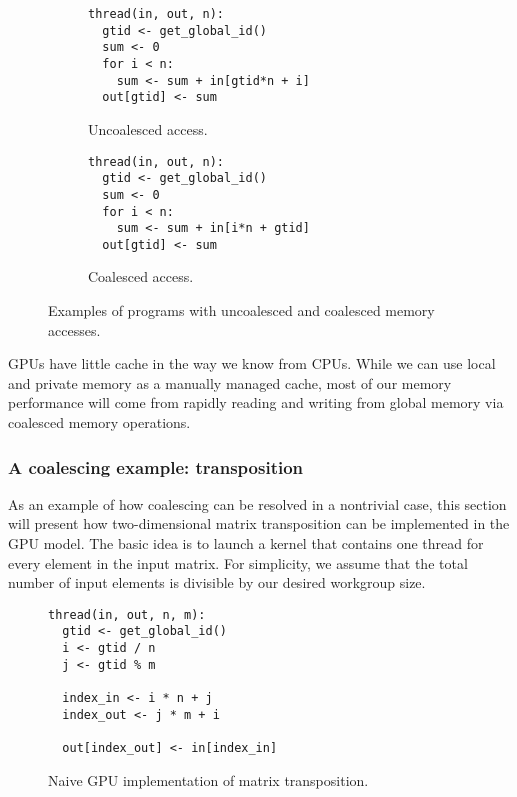 \begin{figure}
  \centering
\begin{subfigure}{0.8\textwidth}
\begin{lstlisting}[language={}]
thread(in, out, n):
  gtid <- get_global_id()
  sum <- 0
  for i < n:
    sum <- sum + in[gtid*n + i]
  out[gtid] <- sum
\end{lstlisting}

  \caption{Uncoalesced access.}
  \label{fig:gpu-mem-access-uncoalesced}
  \end{subfigure}

\vspace{2ex}

  \begin{subfigure}{0.8\columnwidth}
\begin{lstlisting}[language={}]
thread(in, out, n):
  gtid <- get_global_id()
  sum <- 0
  for i < n:
    sum <- sum + in[i*n + gtid]
  out[gtid] <- sum
\end{lstlisting}

  \caption{Coalesced access.}
  \label{fig:gpu-mem-access-coalesced}
  \end{subfigure}

  \caption{Examples of programs with uncoalesced and coalesced memory accesses.}
  \label{fig:gpu-mem-access}
\end{figure}

GPUs have little cache in the way we know from CPUs.  While we can use
local and private memory as a manually managed cache, most of our
memory performance will come from rapidly reading and writing from
global memory via coalesced memory operations.

\subsubsection{A coalescing example: transposition}
\label{sec:gpu-transposition}

As an example of how coalescing can be resolved in a nontrivial case,
this section will present how two-dimensional matrix transposition can
be implemented in the GPU model.  The basic idea is to launch a kernel
that contains one thread for every element in the input matrix.  For
simplicity, we assume that the total number of input elements is
divisible by our desired workgroup size.

\begin{figure}

\begin{lstlisting}[language={}]
thread(in, out, n, m):
  gtid <- get_global_id()
  i <- gtid / n
  j <- gtid % m

  index_in <- i * n + j
  index_out <- j * m + i

  out[index_out] <- in[index_in]
\end{lstlisting}

  \caption{Naive GPU implementation of matrix transposition.}
  \label{fig:naive-gpu-transposition}
\end{figure}

